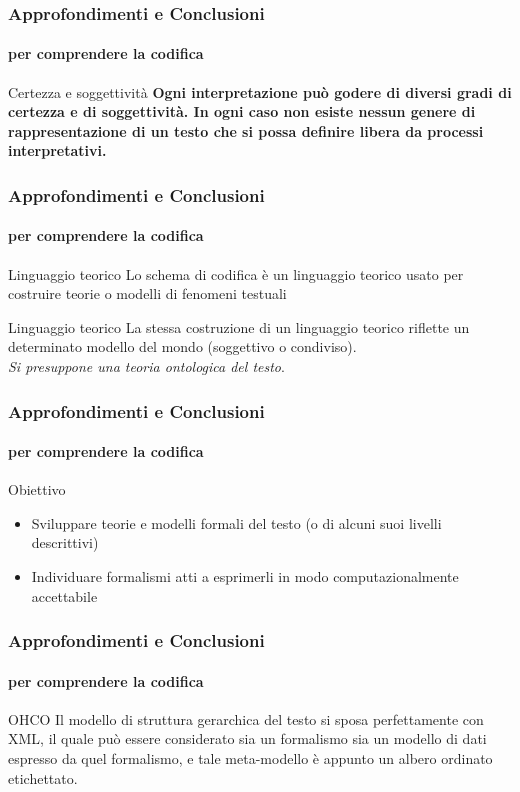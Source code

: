 \begin{frame}
	\frametitle{Approfondimenti e Conclusioni}
	\framesubtitle{per comprendere la codifica}
	\addtocounter{nframe}{1}

	\begin{block}{Certezza e soggettività}
		\textbf{Ogni interpretazione può godere di diversi gradi di certezza e di soggettività. In ogni caso non esiste nessun genere di rappresentazione di un testo che si possa definire libera da processi interpretativi.}
    \end{block}
   
\end{frame}

\begin{frame}
	\frametitle{Approfondimenti e Conclusioni}
	\framesubtitle{per comprendere la codifica}
	\addtocounter{nframe}{1}

	\begin{block}{Linguaggio teorico}
		Lo schema di codifica è un linguaggio teorico usato per costruire teorie o modelli di fenomeni testuali
    \end{block}

    \begin{block}{Linguaggio teorico}
        La stessa costruzione di un linguaggio teorico riflette un determinato modello del mondo (soggettivo o condiviso).
        \\ \textit{Si presuppone una teoria ontologica del testo}.
    \end{block}
   
\end{frame}

\begin{frame}
	\frametitle{Approfondimenti e Conclusioni}
	\framesubtitle{per comprendere la codifica}
	\addtocounter{nframe}{1}

	\begin{block}{Obiettivo}
		\begin{itemize}
			\item Sviluppare teorie e modelli formali del testo (o di alcuni suoi livelli descrittivi)
			\item Individuare formalismi atti a esprimerli in modo computazionalmente accettabile
		\end{itemize}
	
    \end{block}
   
\end{frame}

\begin{frame}
	\frametitle{Approfondimenti e Conclusioni}
	\framesubtitle{per comprendere la codifica}
	\addtocounter{nframe}{1}

	\begin{block}{OHCO}
		 Il modello di struttura gerarchica del testo si sposa perfettamente con XML, il quale può essere considerato sia un formalismo sia un modello di dati espresso da quel formalismo, e tale meta-modello è appunto un albero ordinato etichettato.
	
    \end{block}
   
\end{frame}

